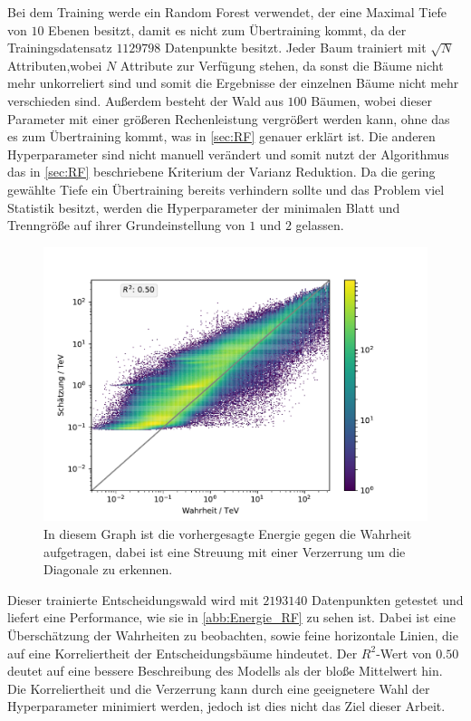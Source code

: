 Bei dem Training werde ein Random Forest verwendet, der eine Maximal Tiefe von $10$ Ebenen besitzt, damit es nicht zum Übertraining
kommt, da der Trainingsdatensatz $\num{1129798}$ Datenpunkte besitzt.
Jeder Baum trainiert mit $\sqrt{N}$ Attributen,wobei $N$ Attribute zur Verfügung stehen, da sonst die Bäume nicht mehr unkorreliert
sind und somit die Ergebnisse der einzelnen Bäume nicht mehr verschieden sind.
Außerdem besteht der Wald aus $100$ Bäumen, wobei dieser Parameter mit einer größeren Rechenleistung vergrößert werden kann, ohne
das es zum Übertraining kommt, was in \autoref{sec:RF} genauer erklärt ist.
Die anderen Hyperparameter sind nicht manuell verändert und somit nutzt der Algorithmus das in \autoref{sec:RF} beschriebene Kriterium der
Varianz Reduktion.
Da die gering gewählte Tiefe ein Übertraining bereits verhindern sollte und das Problem viel Statistik besitzt, werden die Hyperparameter
der minimalen Blatt und Trenngröße auf ihrer Grundeinstellung von $1$ und $2$ gelassen.

\begin{figure}
  \includegraphics[width=\textwidth]{Plots/RF.pdf}
  \centering
  \caption{In diesem Graph ist die vorhergesagte Energie gegen die Wahrheit aufgetragen, dabei ist eine Streuung mit einer Verzerrung um die
          Diagonale zu erkennen.}
  \label{abb:Energie_RF}
\end{figure}

Dieser trainierte Entscheidungswald wird mit $\num{2193140}$ Datenpunkten getestet und liefert eine Performance, wie sie in \autoref{abb:Energie_RF} zu sehen ist.
Dabei ist eine Überschätzung der Wahrheiten zu beobachten, sowie feine horizontale Linien, die auf eine Korreliertheit der Entscheidungsbäume hindeutet.
Der $R^2$-Wert von $\num{0.50}$ deutet auf eine bessere Beschreibung des Modells als der bloße Mittelwert hin.
Die Korreliertheit und die Verzerrung kann durch eine geeignetere Wahl der Hyperparameter minimiert werden, jedoch ist dies nicht das Ziel dieser
Arbeit.

